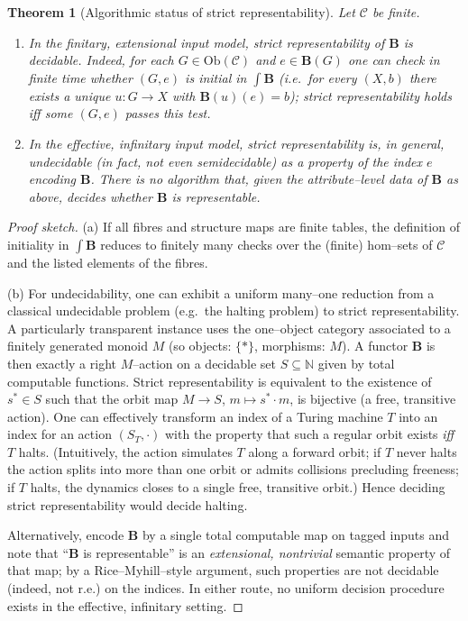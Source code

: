 \documentclass[11pt]{article}
\theoremstyle{upright}
\newtheorem{theorem}{Theorem}
\begin{document}
\begin{theorem}[Algorithmic status of strict representability]\label{thm:alg-status}
Let $\mathcal C$ be finite.
\begin{enumerate}[leftmargin=2em,label=(\alph*)]
\item In the finitary, extensional input model, strict representability of $\mathbf B$ is \emph{decidable}. Indeed, for each $G\in\mathrm{Ob}(\mathcal C)$ and $e\in\mathbf B(G)$ one can check in finite time whether $(G,e)$ is initial in $\int\!\mathbf B$ (i.e.\ for every $(X,b)$ there exists a unique $u:G\to X$ with $\mathbf B(u)(e)=b$); strict representability holds iff some $(G,e)$ passes this test.

\item In the effective, infinitary input model, strict representability is, in general, \emph{undecidable} (in fact, not even semidecidable) as a property of the index $e$ encoding $\mathbf B$. There is no algorithm that, given the attribute–level data of $\mathbf B$ as above, decides whether $\mathbf B$ is representable.
\end{enumerate}
\end{theorem}

\begin{proof}[Proof sketch]
(a) If all fibres and structure maps are finite tables, the definition of initiality in $\int\!\mathbf B$ reduces to finitely many checks over the (finite) hom–sets of $\mathcal C$ and the listed elements of the fibres.

(b) For undecidability, one can exhibit a uniform many–one reduction from a classical undecidable problem (e.g.\ the halting problem) to strict representability. A particularly transparent instance uses the one–object category associated to a finitely generated monoid $M$ (so objects: $\{*\}$, morphisms: $M$). A functor $\mathbf B$ is then exactly a right $M$–action on a decidable set $S\subseteq\mathbb N$ given by total computable functions. Strict representability is equivalent to the existence of $s^\ast\in S$ such that the orbit map $M\to S$, $m\mapsto s^\ast\cdot m$, is bijective (a free, transitive action). One can effectively transform an index of a Turing machine $T$ into an index for an action $(S_T,\cdot)$ with the property that such a regular orbit exists \emph{iff} $T$ halts. (Intuitively, the action simulates $T$ along a forward orbit; if $T$ never halts the action splits into more than one orbit or admits collisions precluding freeness; if $T$ halts, the dynamics closes to a single free, transitive orbit.) Hence deciding strict representability would decide halting. 

Alternatively, encode $\mathbf B$ by a single total computable map on tagged inputs and note that “$\mathbf B$ is representable” is an \emph{extensional, nontrivial} semantic property of that map; by a Rice–Myhill–style argument, such properties are not decidable (indeed, not r.e.) on the indices. In either route, no uniform decision procedure exists in the effective, infinitary setting.
\end{proof}
\end{document}
